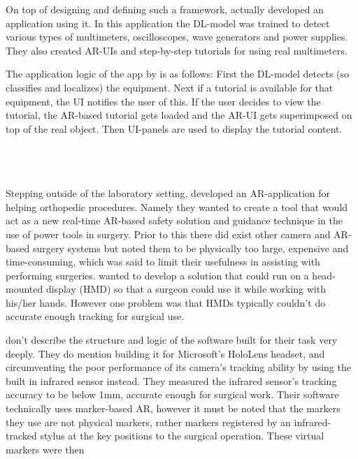 	On top of designing and defining such a framework, \textcite{estrada} 
actually developed an application using it. In this application the DL-model 
was trained to detect various types of multimeters, oscilloscopes, wave 
generators and power supplies. They also created AR-UIs and step-by-step 
tutorials for using real multimeters.\cite{estrada}\par
	The application logic of the app by \textcite{estrada} is as follows: 
First the DL-model detects (so classifies and localizes) the equipment. Next 
if a tutorial is available for that equipment, the UI notifies the user of this.
If the user decides to view the tutorial, the AR-based tutorial gets loaded 
and the AR-UI gets superimposed on top of the real object. Then UI-panels are 
used to display the tutorial content. \par
\\
\\
\\
Stepping outside of the laboratory setting, \textcite{VanGestel2024} developed 
an AR-application for helping orthopedic procedures. Namely they wanted to 
create a tool that would act as a new real-time AR-based safety solution and 
guidance technique in the use of power tools in surgery. Prior to this there 
did exist other camera and AR-based surgery systems but 
\textcite{VanGestel2024} noted them to be physically too large, expensive and 
time-consuming, which was said to limit their usefulness in assisting with 
performing surgeries. \textcite{VanGestel2024} wanted to develop a solution 
that could run on a head-mounted display (HMD) so that a surgeon could use 
it while working with his/her hands. However one problem was that HMDs 
typically couldn't do accurate enough tracking for surgical 
use.\cite{VanGestel2024}\par
	\textcite{VanGestel2024} don't describe the structure and logic 
of the software built for their task very deeply. They do mention building it 
for Microsoft's HoloLens headset, and circumventing the poor performance of 
its camera's tracking ability by using the built in infrared sensor 
instead.\cite{VanGestel2024} They measured the infrared sensor's tracking 
accuracy to be below 1mm, accurate enough for surgical 
work.\cite{VanGestel2024} Their software technically uses marker-based AR, 
however it must be noted that the markers they use are not physical markers, 
rather markers registered by an infrared-tracked stylus at the key positions 
to the surgical operation.\cite{VanGestel2024} These virtual markers were then 
